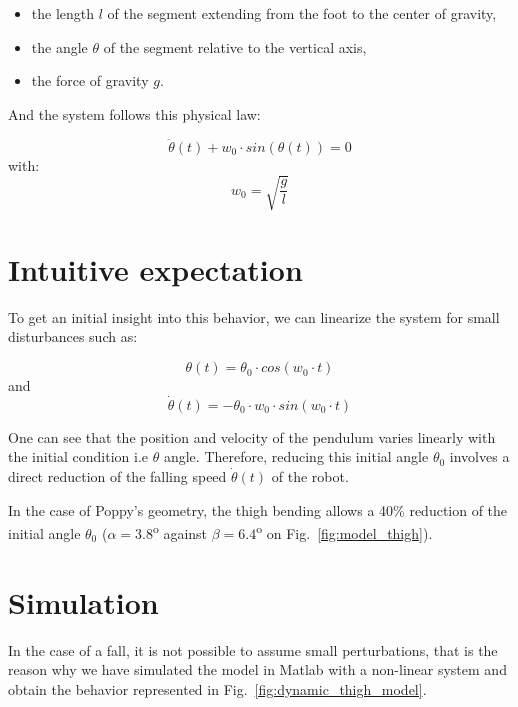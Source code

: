 \begin{itemize}
    \item the length $l$ of the segment extending from the foot to the center of gravity,
    \item the angle $\theta$ of the segment relative to the vertical axis,
    \item the force of gravity $g$.
\end{itemize}

And the system follows this physical law:

\begin{equation}
    \ddot{\theta}(t) + w_0 \cdot sin(\theta(t)) = 0
\end{equation}
with:
\begin{equation}
    w_0 = \sqrt{\frac{g}{l}}
\end{equation}

\section{Intuitive expectation} %

To get an initial insight into this behavior, we can linearize the system for small disturbances such as:

\begin{equation}
    \theta(t) = \theta_0 \cdot cos(w_0\cdot t)
\end{equation}
and
\begin{equation}
    \dot{\theta}(t) = -\theta_0 \cdot w_0 \cdot sin(w_0\cdot t)
\end{equation}

One can see that the position and velocity of the pendulum varies linearly with the initial condition i.e $\theta$ angle. Therefore, reducing this initial angle $\theta_0$ involves a direct reduction of the falling speed $\dot{\theta}(t)$ of the robot.

In the case of Poppy's geometry, the thigh bending allows a 40\% reduction of the initial angle $\theta_0$ ($\alpha = 3.8$\textsuperscript{o} against $ \beta = 6.4$\textsuperscript{o} on Fig.~\ref{fig:model_thigh}).

\section{Simulation} %

In the case of a fall, it is not possible to assume small perturbations, that is the reason why we have simulated the model in Matlab with a non-linear system and obtain the behavior represented in Fig.~\ref{fig:dynamic_thigh_model}.

